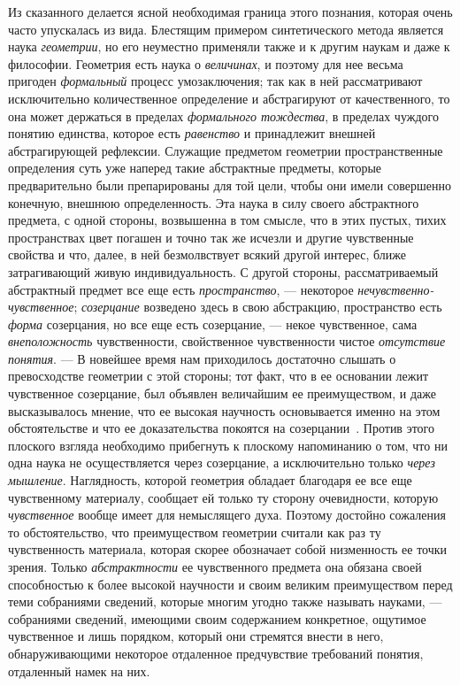 \documentclass[twoside]{article}
\begin{document}
Из сказанного делается ясной необходимая граница этого
познания, которая очень часто упускалась из вида. Блестящим примером
синтетического метода является наука
{\em геометрии}, но его
неуместно применяли также и к другим наукам и даже к философии. Геометрия
есть наука о {\em величинах},
и поэтому для нее весьма пригоден
{\em формальный} процесс
умозаключения; так как в ней рассматривают исключительно
количественное определение и абстрагируют от качественного, то она может
держаться в пределах {\em формального
тождества}, в пределах чуждого понятию единства, которое
есть {\em равенство} и
принадлежит внешней абстрагирующей рефлексии. Служащие предметом геометрии
пространственные определения суть уже наперед такие абстрактные предметы,
которые предварительно были препарированы для той цели, чтобы они имели
совершенно конечную, внешнюю определенность. Эта наука в силу своего
абстрактного предмета, с одной стороны, возвышенна в том смысле, что в этих
пустых, тихих пространствах цвет погашен и точно так же исчезли и другие
чувственные свойства и что, далее, в ней безмолвствует всякий другой
интерес, ближе затрагивающий живую индивидуальность. С другой стороны,
рассматриваемый абстрактный предмет все еще есть
{\em пространство}, —
некоторое
{\em нечувственно-чувственное};
{\em созерцание} возведено
здесь в свою абстракцию, пространство есть
{\em форма} созерцания,
но все еще есть созерцание, — некое чувственное, сама
{\em внеположность}
чувственности, свойственное чувственности чистое
{\em отсутствие понятия}. —
В новейшее время нам приходилось достаточно слышать о
превосходстве геометрии с этой стороны; тот факт, что в ее основании лежит
чувственное созерцание, был объявлен величайшим ее преимуществом, и даже
высказывалось мнение, что ее высокая научность основывается именно на этом
обстоятельстве и что ее доказательства покоятся на
созерцании~\label{bkm:bm115}.
Против этого плоского взгляда необходимо прибегнуть к
плоскому напоминанию о том, что ни одна наука не осуществляется через
созерцание, а исключительно только
{\em через мышление}.
Наглядность, которой геометрия обладает благодаря ее все еще
чувственному материалу, сообщает ей только ту сторону очевидности, которую
{\em чувственное} вообще
имеет для немыслящего духа. Поэтому достойно сожаления то обстоятельство,
что преимуществом геометрии считали как раз ту чувственность материала,
которая скорее обозначает собой низменность ее точки зрения. Только
{\em абстрактности} ее
чувственного предмета она обязана своей способностью к более высокой
научности и своим великим преимуществом перед теми собраниями сведений,
которые многим угодно также называть науками, — собраниями
сведений, имеющими своим содержанием конкретное, ощутимое чувственное и
лишь порядком, который они стремятся внести в него, обнаруживающими
некоторое отдаленное предчувствие требований понятия, отдаленный намек на
них.
\end{document}
